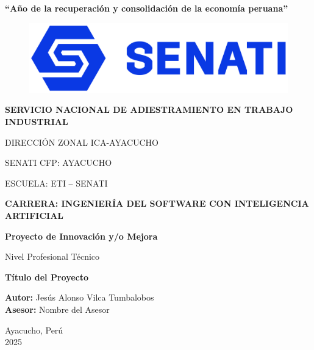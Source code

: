 \begin{titlepage}
	\centering
	{\large\textbf{“Año de la recuperación y consolidación de la economía peruana”}\par}
	\vspace{0.5cm}
	
	
	\begin{figure}
		\centering
		\includegraphics[width=0.5\linewidth]{figuras/Senati_peru}
	\end{figure}
	
	\vspace{0.5cm}
	
	{\large\textbf{SERVICIO NACIONAL DE ADIESTRAMIENTO EN TRABAJO INDUSTRIAL}\par}
	{\large DIRECCIÓN ZONAL ICA-AYACUCHO \par}
	{\large SENATI CFP: AYACUCHO\par}
	{\large ESCUELA: ETI – SENATI\par}
	\vspace{0.5cm}
	
	{\large\textbf{CARRERA: INGENIERÍA DEL SOFTWARE CON INTELIGENCIA ARTIFICIAL}\par}
	\vspace{0.5cm}
	
	{\large\textbf{Proyecto de Innovación y/o Mejora}\par}
	{\large Nivel Profesional Técnico\par}
	\vspace{0.5cm}
	
	{\LARGE\textbf{Título del Proyecto}}\par
	\vspace{0.5cm}
	
	
	\begin{flushleft}
		{\large\textbf{Autor:} Jesús Alonso Vilca Tumbalobos} \\
		{\large\textbf{Asesor:} Nombre del Asesor}
		
	\end{flushleft}
	
	\vfill
	
	{\large Ayacucho, Perú \\
		2025\par}
\end{titlepage}
